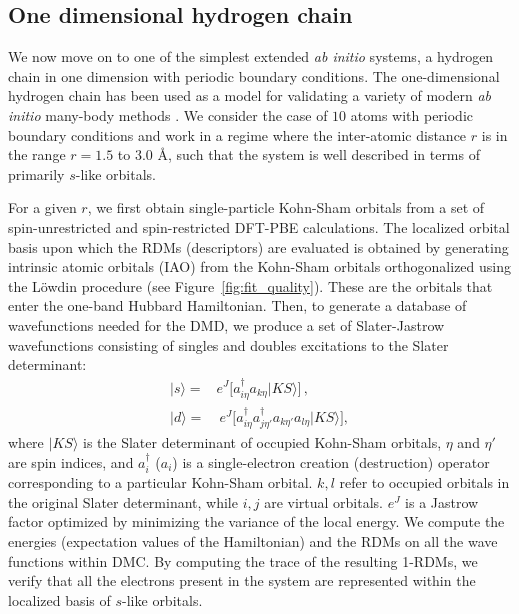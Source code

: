 \subsection{One dimensional hydrogen chain}
\label{subsection:1dhydrogen}
We now move on to one of the simplest extended \emph{ab initio} systems, a hydrogen chain in one dimension with periodic boundary conditions. The one-dimensional hydrogen chain has been used as a model for validating a variety of modern \textit{ab initio} many-body methods \cite{H10_Simons}. 
We consider the case of $10$ atoms with periodic boundary conditions and work in a regime where the inter-atomic distance $r$ is in the range $r=1.5$ to $3.0$ \AA, such that the system is  well described in terms of primarily $s$-like orbitals. 

For a given $r$, we first obtain single-particle Kohn-Sham orbitals from a set of spin-unrestricted and 
spin-restricted DFT-PBE calculations. The localized orbital basis upon which the RDMs (descriptors) 
are evaluated is obtained by generating intrinsic atomic orbitals (IAO) from the Kohn-Sham orbitals 
orthogonalized using the L\"owdin procedure (see Figure~\ref{fig:fit_quality}). These are the orbitals that enter the one-band Hubbard Hamiltonian. 
Then, to generate a database of wavefunctions needed for the DMD, we produce a set of Slater-Jastrow 
wavefunctions consisting of singles and doubles excitations to the Slater determinant:
\begin{subequations}
\begin{eqnarray}
| s \rangle = & e^J \Big[a^\dagger_{i \eta} a_{k \eta}   | KS \rangle \Big] \,,\\
| d \rangle = & \: e^J \Big[a^\dagger_{i \eta} a^\dagger_{j \eta'} a_{k \eta'} a_{l \eta}   | KS \rangle\Big] ,
\end{eqnarray}
\end{subequations}
where $|KS\rangle$ is the Slater determinant of occupied Kohn-Sham orbitals, $\eta$ and $\eta'$ are spin indices, 
and $a_{i}^\dagger$ ($a_{i}$) is a single-electron creation (destruction) operator corresponding to a particular Kohn-Sham orbital. $k,l$ refer to occupied orbitals in the original Slater determinant, while $i,j$ are virtual orbitals. 
$e^J$ is a Jastrow factor optimized by minimizing the variance of the local energy. 
We compute the energies (expectation values of the Hamiltonian) and the RDMs on all the wave functions within DMC. 
By computing the trace of the resulting 1-RDMs, we verify that all the electrons present in the system are represented within the localized basis of $s$-like orbitals. 
